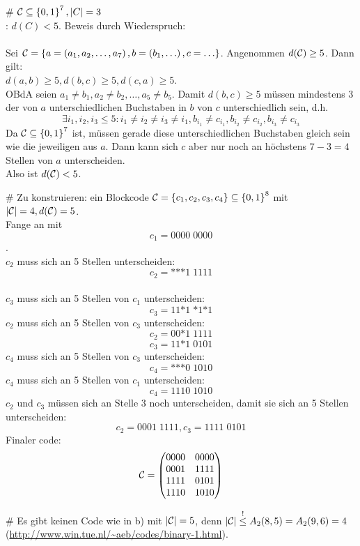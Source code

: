 \begin{myList}
# $\mathcal{C} \subseteq\left\lbrace 0,1 \right\rbrace^7, |C|=3$\\
\ZZ: $d(C)< 5$. Beweis durch Wiederspruch:\\\\
Sei $\mathcal{C}=\left\lbrace a=\left( a_1, a_2,\ldots, a_7 \right), b=\left( b_1, \ldots \right), c=\ldots \right\rbrace$. Angenommen $d(\mathcal{C})\geq 5$. Dann gilt:\\
$d(a, b)\geq 5, d(b, c)\geq 5, d(c, a)\geq 5$.\\
OBdA seien $a_1\not=b_1, a_2\not=b_2, \ldots, a_5\not= b_5$. Damit $d(b, c)\geq 5$ müssen mindestens 3 der von $a$ unterschiedlichen Buchstaben in $b$ von $c$ unterschiedlich sein, d.h.
$$\exists i_1, i_2, i_3 \leq 5: i_1\not=i_2\not=i_3\not=i_1, b_{i_1}\not= c_{i_1},   b_{i_2}\not= c_{i_2},   b_{i_3}\not= c_{i_3} $$
Da $\mathcal{C}\subseteq\left\lbrace 0, 1 \right\rbrace^7$ ist, müssen gerade diese unterschiedlichen Buchstaben gleich sein wie die jeweiligen aus $a$. Dann kann sich $c$ aber nur noch an höchstens $7-3=4$ Stellen von $a$ unterscheiden. \\
Also ist $d(\mathcal{C})< 5$.

# Zu konstruieren: ein Blockcode $\mathcal{C}=\left\lbrace c_1, c_2, c_3, c_4 \right\rbrace\subseteq\left\lbrace 0,1 \right\rbrace^8$ mit $|\mathcal{C}|=4, d(\mathcal{C})=5$.   \\
Fange an mit $$c_1=0000\;0000$$.\\
$c_2$ muss sich an 5 Stellen unterscheiden: $$c_2= \mbox{*}\mbox{*}\mbox{*}1\;1111$$\\
$c_3$ muss sich an 5 Stellen von $c_1$ unterscheiden: $$c_3=11\mbox{*}1\;\mbox{*}1\mbox{*}1$$
$c_2$ muss sich an 5 Stellen von $c_3$ unterscheiden: $$c_2=00\mbox{*}1\;1111$$
$$c_3=11\mbox{*}1\;0101$$
$c_4$ muss sich an 5 Stellen von $c_3$ unterscheiden:
$$c_4=\mbox{*}\mbox{*}\mbox{*}0\;1010$$
$c_4$ muss sich an 5 Stellen von $c_1$ unterscheiden:
$$c_4=1110\;1010$$
$c_2$ und $c_3$ müssen sich an Stelle 3 noch unterscheiden, damit sie sich an 5 Stellen unterscheiden:
$$c_2=0001\;1111, c_3=1111\;0101$$
Finaler code:
$$\mathcal{C}=\begin{pmatrix}
0000&0000\\
0001&1111\\
1111&0101\\
1110&1010
\end{pmatrix}$$

# Es gibt keinen Code wie in b) mit $|\mathcal{C}|=5$, denn $|\mathcal{C}|\overset ! \leq A_2(8, 5) = A_2(9, 6) = 4$ \\(\url{http://www.win.tue.nl/~aeb/codes/binary-1.html}).
\end{myList}






